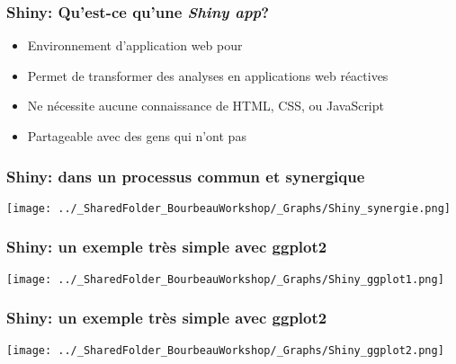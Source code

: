 \documentclass{beamer}
\begin{document}
    \begin{frame}
    
      \frametitle{Shiny: Qu'est-ce qu'une \emph{Shiny app}?} \vspace{1cm}
      
    
    
        \begin{itemize}
          \item{Environnement d'application web pour \R}
          \item{Permet de transformer des analyses en applications web réactives}
          \item{Ne nécessite aucune connaissance de HTML, CSS, ou JavaScript}
          \item{Partageable avec des gens qui n’ont pas \R}
        \end{itemize}
          
    \end{frame}  
    

    \begin{frame}
    
      \frametitle{Shiny: dans un processus commun et synergique} \vspace{1cm}
      
        \begin{center}
      	  \texttt{[image: ../\_SharedFolder\_BourbeauWorkshop/\_Graphs/Shiny\_synergie.png]}
        \end{center} 
      
          
    \end{frame}  
    

    \begin{frame}
    
      \frametitle{Shiny: un exemple très simple avec ggplot2} \vspace{1cm}
      
        \begin{center}
      	  \texttt{[image: ../\_SharedFolder\_BourbeauWorkshop/\_Graphs/Shiny\_ggplot1.png]}
        \end{center} 
      
          
    \end{frame} 
    

    \begin{frame}
    
      \frametitle{Shiny: un exemple très simple avec ggplot2} \vspace{1cm}
      
        \begin{center}
      	  \texttt{[image: ../\_SharedFolder\_BourbeauWorkshop/\_Graphs/Shiny\_ggplot2.png]}
        \end{center} 
      
          
    \end{frame} 
    
\end{document}
